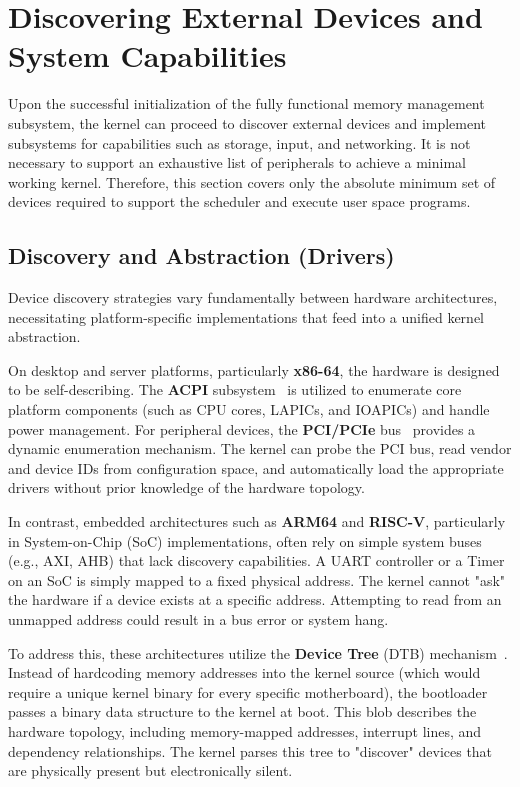 \documentclass[a4paper,10pt,twoside]{report}
\theoremstyle{definition}
\begin{document}
\section{Discovering External Devices and System Capabilities}
\label{sec:discovery}

Upon the successful initialization of the fully functional memory management subsystem, the kernel can proceed to discover external devices and implement subsystems for capabilities such as storage, input, and networking. It is not necessary to support an exhaustive list of peripherals to achieve a minimal working kernel. Therefore, this section covers only the absolute minimum set of devices required to support the scheduler and execute user space programs.

\subsection{Discovery and Abstraction (Drivers)}

Device discovery strategies vary fundamentally between hardware architectures, necessitating platform-specific implementations that feed into a unified kernel abstraction. 

On desktop and server platforms, particularly \textbf{x86-64}, the hardware is designed to be self-describing. The \textbf{ACPI} subsystem~\cite{ACPI-spec} is utilized to enumerate core platform components (such as CPU cores, LAPICs, and IOAPICs) and handle power management. For peripheral devices, the \textbf{PCI/PCIe} bus~\cite{osdev-pci} provides a dynamic enumeration mechanism. The kernel can probe the PCI bus, read vendor and device IDs from configuration space, and automatically load the appropriate drivers without prior knowledge of the hardware topology.

In contrast, embedded architectures such as \textbf{ARM64} and \textbf{RISC-V}, particularly in System-on-Chip (SoC) implementations, often rely on simple system buses (e.g., AXI, AHB) that lack discovery capabilities. A UART controller or a Timer on an SoC is simply mapped to a fixed physical address. The kernel cannot "ask" the hardware if a device exists at a specific address. Attempting to read from an unmapped address could result in a bus error or system hang. 

To address this, these architectures utilize the \textbf{Device Tree} (DTB) mechanism~\cite{Devicetree-Spec}. Instead of hardcoding memory addresses into the kernel source (which would require a unique kernel binary for every specific motherboard), the bootloader passes a binary data structure to the kernel at boot. This blob describes the hardware topology, including memory-mapped addresses, interrupt lines, and dependency relationships. The kernel parses this tree to "discover" devices that are physically present but electronically silent.
\end{document}
